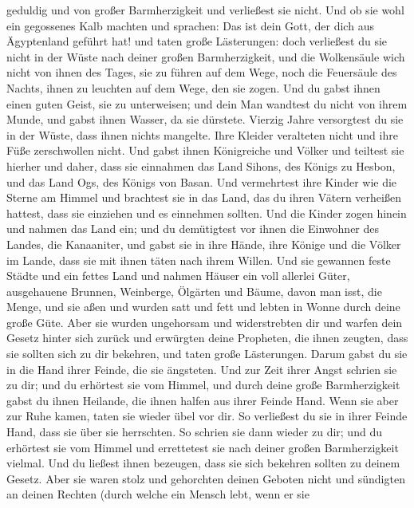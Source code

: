 geduldig und von großer Barmherzigkeit und verließest sie nicht.
 Und ob sie wohl ein gegossenes Kalb machten und sprachen:
Das ist dein Gott, der dich aus Ägyptenland geführt hat! und taten große
Lästerungen:  doch verließest du sie nicht in der Wüste
nach deiner großen Barmherzigkeit, und die Wolkensäule wich nicht von
ihnen des Tages, sie zu führen auf dem Wege, noch die Feuersäule des
Nachts, ihnen zu leuchten auf dem Wege, den sie zogen.  Und
du gabst ihnen einen guten Geist, sie zu unterweisen; und dein Man
wandtest du nicht von ihrem Munde, und gabst ihnen Wasser, da sie
dürstete.  Vierzig Jahre versorgtest du sie in der Wüste,
dass ihnen nichts mangelte. Ihre Kleider veralteten nicht und ihre Füße
zerschwollen nicht.  Und gabst ihnen Königreiche und Völker
und teiltest sie hierher und daher, dass sie einnahmen das Land Sihons,
des Königs zu Hesbon, und das Land Ogs, des Königs von Basan.
 Und vermehrtest ihre Kinder wie die Sterne am Himmel und
brachtest sie in das Land, das du ihren Vätern verheißen hattest, dass
sie einziehen und es einnehmen sollten.  Und die Kinder
zogen hinein und nahmen das Land ein; und du demütigtest vor ihnen die
Einwohner des Landes, die Kanaaniter, und gabst sie in ihre Hände, ihre
Könige und die Völker im Lande, dass sie mit ihnen täten nach ihrem
Willen.  Und sie gewannen feste Städte und ein fettes Land
und nahmen Häuser ein voll allerlei Güter, ausgehauene Brunnen,
Weinberge, Ölgärten und Bäume, davon man isst, die Menge, und sie aßen
und wurden satt und fett und lebten in Wonne durch deine große Güte.
 Aber sie wurden ungehorsam und widerstrebten dir und
warfen dein Gesetz hinter sich zurück und erwürgten deine Propheten, die
ihnen zeugten, dass sie sollten sich zu dir bekehren, und taten große
Lästerungen.  Darum gabst du sie in die Hand ihrer Feinde,
die sie ängsteten. Und zur Zeit ihrer Angst schrien sie zu dir; und du
erhörtest sie vom Himmel, und durch deine große Barmherzigkeit gabst du
ihnen Heilande, die ihnen halfen aus ihrer Feinde Hand. 
Wenn sie aber zur Ruhe kamen, taten sie wieder übel vor dir. So
verließest du sie in ihrer Feinde Hand, dass sie über sie herrschten. So
schrien sie dann wieder zu dir; und du erhörtest sie vom Himmel und
errettetest sie nach deiner großen Barmherzigkeit vielmal. 
Und du ließest ihnen bezeugen, dass sie sich bekehren sollten zu deinem
Gesetz. Aber sie waren stolz und gehorchten deinen Geboten nicht und
sündigten an deinen Rechten (durch welche ein Mensch lebt, wenn er sie

